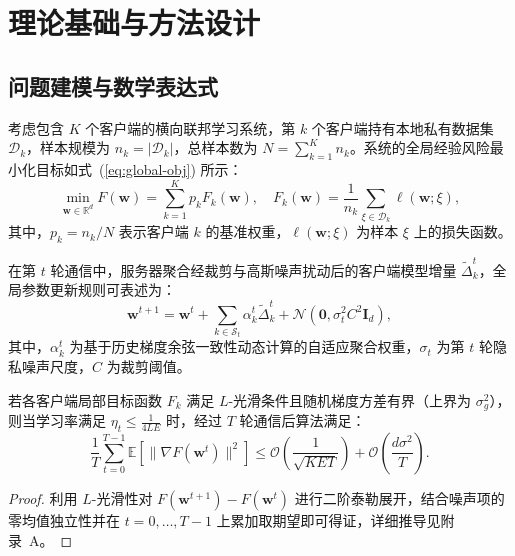 
\chapter{理论基础与方法设计}

\section{问题建模与数学表达式}

考虑包含 $K$ 个客户端的横向联邦学习系统，第 $k$ 个客户端持有本地私有数据集 $\mathcal{D}_k$，样本规模为 $n_k = |\mathcal{D}_k|$，总样本数为 $N = \sum_{k=1}^{K} n_k$。系统的全局经验风险最小化目标如式~(\ref{eq:global-obj}) 所示：
\begin{equation}
  \min_{\mathbf{w} \in \mathbb{R}^{d}} F(\mathbf{w})
  = \sum_{k=1}^{K} p_k F_k(\mathbf{w}),
  \quad
  F_k(\mathbf{w}) = \frac{1}{n_k} \sum_{\xi \in \mathcal{D}_k} \ell(\mathbf{w}; \xi),
  \label{eq:global-obj}
\end{equation}
其中，$p_k = n_k / N$ 表示客户端 $k$ 的基准权重，$\ell(\mathbf{w}; \xi)$ 为样本 $\xi$ 上的损失函数。

在第 $t$ 轮通信中，服务器聚合经裁剪与高斯噪声扰动后的客户端模型增量 $\tilde{\Delta}_k^t$，全局参数更新规则可表述为：
\begin{equation}
  \mathbf{w}^{t+1}
  = \mathbf{w}^t + \sum_{k \in \mathcal{S}_t} \alpha_k^t \tilde{\Delta}_k^t
  + \mathcal{N}\!\left(\mathbf{0}, \sigma_t^2 C^2 \mathbf{I}_d\right),
  \label{eq:dp-update}
\end{equation}
其中，$\alpha_k^t$ 为基于历史梯度余弦一致性动态计算的自适应聚合权重，$\sigma_t$ 为第 $t$ 轮隐私噪声尺度，$C$ 为裁剪阈值。

\begin{theorem}[非凸目标收敛上界]
  若各客户端局部目标函数 $F_k$ 满足 $L$-光滑条件且随机梯度方差有界（上界为 $\sigma_g^2$），则当学习率满足 $\eta_t \le \frac{1}{4 L E}$ 时，经过 $T$ 轮通信后算法满足：
  \begin{equation}
    \frac{1}{T} \sum_{t=0}^{T-1} \mathbb{E}\!\left[\|\nabla F(\mathbf{w}^t)\|^2\right]
    \le \mathcal{O}\!\left(\frac{1}{\sqrt{K E T}}\right)
    + \mathcal{O}\!\left(\frac{d \sigma^2}{T}\right).
    \label{eq:conv-bound}
  \end{equation}
\end{theorem}

\begin{proof}
  利用 $L$-光滑性对 $F(\mathbf{w}^{t+1}) - F(\mathbf{w}^t)$ 进行二阶泰勒展开，结合噪声项的零均值独立性并在 $t = 0, \dots, T-1$ 上累加取期望即可得证，详细推导见附录~A。
\end{proof}

